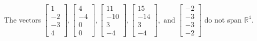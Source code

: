 \begin{exercise}
\begin{exerciseStatement}
  \end{exerciseStatement}
  \begin{exerciseAnswer}
   The vectors \(\left[\begin{array}{r}
1 \\
-2 \\
-3 \\
4
\end{array}\right] , \left[\begin{array}{r}
4 \\
-4 \\
0 \\
0
\end{array}\right] , \left[\begin{array}{r}
11 \\
-10 \\
3 \\
-4
\end{array}\right] , \left[\begin{array}{r}
15 \\
-14 \\
3 \\
-4
\end{array}\right] , \text{ and } \left[\begin{array}{r}
-2 \\
-3 \\
-3 \\
-2
\end{array}\right]\) 
  	 do not  
	span \(\mathbb{R}^4\).
  


  \end{exerciseAnswer}
\end{exercise}